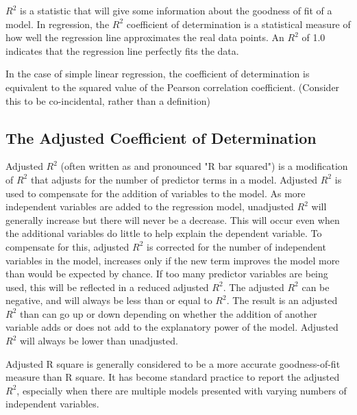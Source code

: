 \documentclass[]{report}
\begin{document}
$R^2$ is a statistic that will give some information about the goodness of fit of a model. In regression, the $R^2$ coefficient of determination is a statistical measure of how well the regression line approximates the real data points. An $R^2$ of 1.0 indicates that the regression line perfectly fits the data.

In the case of simple linear regression, the coefficient of determination is equivalent to the squared value of the Pearson correlation coefficient. (Consider this to be co-incidental, rather than a definition)

\subsection{The Adjusted Coefficient of Determination}
Adjusted $R^2$ (often written as and pronounced "R bar squared") is a modification of $R^2$ that adjusts for the number of predictor terms in a model. Adjusted $R^2$ is used to compensate for the addition of variables to the model.  As more independent variables are added to the regression model, unadjusted $R^2$ will generally increase but there will never be a decrease.  This will occur even when the additional variables do little to help explain the dependent variable.  To compensate for this, adjusted $R^2$  is corrected for the number of independent variables in the model, increases only if the new term improves the model more than would be expected by chance. If too many predictor variables are being used, this will be reflected in a reduced adjusted $R^2$. The adjusted $R^2$ can be negative, and will always be less than or equal to $R^2$. The result is an adjusted $R^2$ than can go up or down depending on whether the addition of another variable adds or does not add to the explanatory power of the model. Adjusted $R^2$ will always be lower than unadjusted.


Adjusted R square is generally considered to be a more accurate goodness-of-fit measure than R square. It has become standard practice to report the adjusted $R^2$, especially when there are multiple models presented with varying numbers of independent variables.

%
%
%
%
%
%
%
\end{document}

